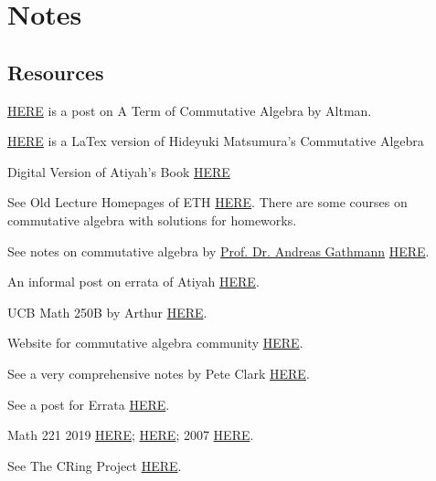 \section{Notes}

\subsection{Resources}


\href{https://mathoverflow.net/questions/385312/latest-a-term-of-commutative-algebra-by-altman-and-kleiman}{HERE} is a post on A Term of Commutative Algebra by Altman.

\href{https://aareyanmanzoor.github.io/assets/matsumura-CA.pdf}{HERE} is a LaTex version of Hideyuki Matsumura's Commutative Algebra

Digital Version of Atiyah's Book \href{https://digitalcommons.unl.edu/cgi/viewcontent.cgi?article=1004&context=mathclass}{HERE}

See Old Lecture Homepages of ETH \href{https://www2.math.ethz.ch/education/bachelor/lectures.html}{HERE}. There are some courses on commutative algebra with solutions for homeworks.

See notes on commutative algebra by \href{https://math.rptu.de/en/wgs/agag/people/head/gathmann/}{Prof. Dr. Andreas Gathmann} \href{https://agag-gathmann.math.rptu.de/en/commalg.php}{HERE}.

An informal post on errata of Atiyah \href{https://mathoverflow.net/questions/42241/errata-for-atiyah-macdonald}{HERE}.

UCB Math 250B by Arthur \href{https://math.berkeley.edu/~ogus/Math_250B-2016/index.html}{HERE}.

Website for commutative algebra community \href{https://commalg.org}{HERE}.

See a very comprehensive notes by Pete Clark \href{http://alpha.math.uga.edu/%7Epete/integral.pdf}{HERE}.

See a post for Errata \href{https://mathoverflow.net/questions/42241/errata-for-atiyah-macdonald}{HERE}.

Math 221 2019 \href{https://people.math.harvard.edu/~bullery/math221/}{HERE}; \href{https://people.math.harvard.edu/~mpopa/221/index.html}{HERE}; 2007 \href{https://dept.math.lsa.umich.edu/~tfylam/Math221/Math221.html}{HERE}.

See The CRing Project \href{https://math.uchicago.edu/~amathew/cr.html}{HERE}.